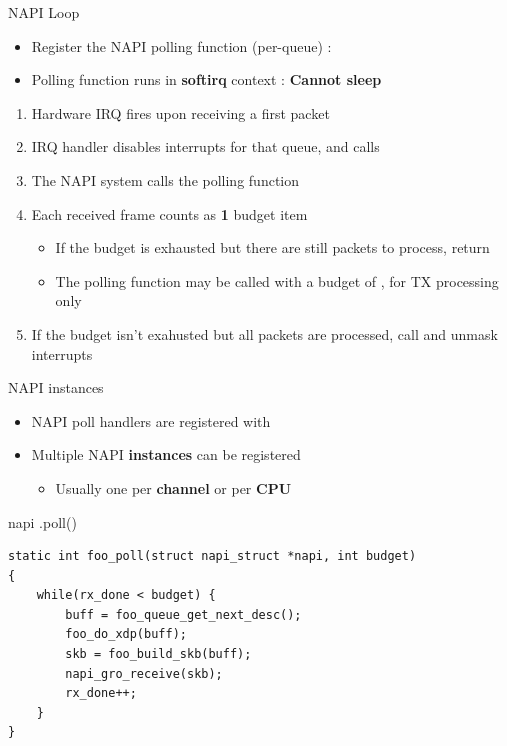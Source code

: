 \begin{frame}{NAPI Loop}
	\begin{itemize}
		\item Register the NAPI polling function (per-queue) : 
		\item Polling function runs in \textbf{softirq} context : \textbf{Cannot sleep}
	\end{itemize}
	\begin{enumerate}
		\item Hardware IRQ fires upon receiving a first packet
		\item IRQ handler disables interrupts for that queue, and calls 
		\item The NAPI system calls the polling function 
		\item Each received frame counts as \textbf{1} budget item
			\begin{itemize}
				\item If the budget is exhausted but there are still packets to process, return 
				\item The polling function may be called with a budget of , for TX processing only
			\end{itemize}
		\item If the budget isn't exahusted but all packets are processed, call  and unmask interrupts
	\end{enumerate}
\end{frame}

\begin{frame}[fragile]{NAPI instances}
	\begin{itemize}
		\item NAPI poll handlers are registered with 
		\item Multiple NAPI \textbf{instances} can be registered
			\begin{itemize}
				\item Usually one per \textbf{channel} or per \textbf{CPU}
			\end{itemize}
	\end{itemize}
	\begin{block}{napi .poll()}
		\begin{verbatim}
static int foo_poll(struct napi_struct *napi, int budget)
{
    while(rx_done < budget) {
        buff = foo_queue_get_next_desc();
        foo_do_xdp(buff);
        skb = foo_build_skb(buff);
        napi_gro_receive(skb);
        rx_done++;
    }
}
		\end{verbatim}
	\end{block}
\end{frame}

